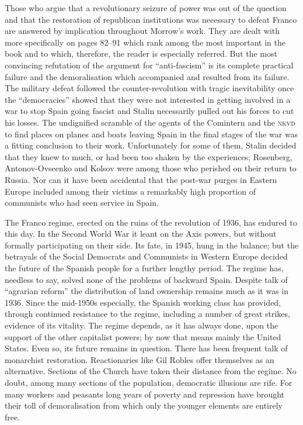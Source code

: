 Those who argue that a revolutionary seizure of power was out of the question and that the restoration of republican institutions was necessary to defeat Franco are answered by implication throughout Morrow’s work. They are dealt with more specifically on pages 82--91 which rank among the most important in the book and to which, therefore, the reader is especially referred. But the most convincing refutation of the argument for ``anti-fascism'' is its complete practical failure and the demoralisation which accompanied and resulted from its failure. The military defeat followed the counter-revolution with tragic inevitability once the ``democracies'' showed that they were not interested in getting involved in a war to stop Spain going fascist and Stalin necessarily pulled out his forces to cut his losses. The undignified scramble of the agents of the Comintern and the \textsc{nkvd} to find places on planes and boats leaving Spain in the final stages of the war was a fitting conclusion to their work. Unfortunately for some of them, Stalin decided that they knew to much, or had been too shaken by the experiences; Rosenberg, Antonov-Ovseenko and Kolsov were among those who perished on their return to Russia. Nor can it have been accidental that the post-war purges in Eastern Europe included among their victims a remarkably high proportion of communists who had seen service in Spain.

The Franco regime, erected on the ruins of the revolution of 1936, has endured to this day. In the Second World War it leant on the Axis powers, but without formally participating on their side. Its fate, in 1945, hung in the balance; but the betrayals of the Social Democrats and Communists in Western Europe decided the future of the Spanish people for a further lengthy period. The regime has, needless to say, solved none of the problems of backward Spain. Despite talk of ``agrarian reform'' the distribution of land ownership remains much as it was in 1936. Since the mid-1950s especially, the Spanish working class has provided, through continued resistance to the regime, including a number of great strikes, evidence of its vitality. The regime depends, as it has always done, upon the support of the other capitalist powers; by now that means mainly the United States. Even so, its future remains in question. There has been frequent talk of monarchist restoration. Reactionaries like Gil Robles offer themselves as an alternative. Sections of the Church have taken their distance from the regime. No doubt, among many sections of the population, democratic illusions are rife. For many workers and peasants long years of poverty and repression have brought their toll of demoralisation from which only the younger elements are entirely free.

